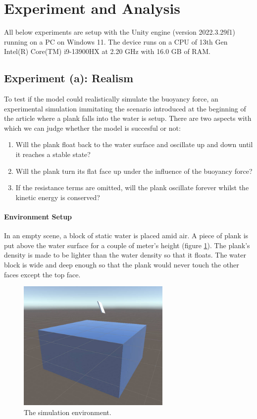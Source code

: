 \section{Experiment and Analysis}

All below experiments are setup with the Unity engine (version 2022.3.29f1) running on a PC on Windows 11.
The device runs on a CPU of 13th Gen Intel(R) Core(TM) i9-13900HX at 2.20 GHz with 16.0 GB of RAM.

\subsection{Experiment (a): Realism}

To test if the model could realistically simulate the buoyancy force, an experimental simulation immitating the scenario introduced at the beginning of the article where a plank falls into the water is setup.
There are two aspects with which we can judge whether the model is succesful or not:
\begin{enumerate}
	\item Will the plank float back to the water surface and oscillate up and down until it reaches a stable state?
	\item Will the plank turn its flat face up under the influence of the buoyancy force?
	\item If the resistance terms are omitted, will the plank oscillate forever whilst the kinetic energy is conserved?
\end{enumerate}

\paragraph{Environment Setup}

In an empty scene, a block of static water is placed amid air.
A piece of plank is put above the water surface for a couple of meter's height (figure \ref{simulation-environment}).
The plank's density is made to be lighter than the water density so that it floats.
The water block is wide and deep enough so that the plank would never touch the other faces except the top face.

\begin{figure}[h]
	\centering
	\includegraphics[height=2.5in]{figures/experiment-environment.jpg}
	\caption{The simulation environment.}
	\label{simulation-environment}
\end{figure}

